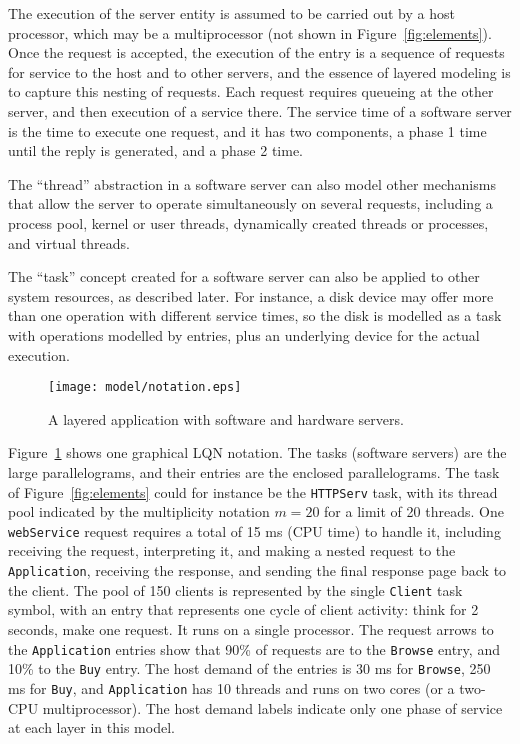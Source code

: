 \documentclass[11pt]{article}
\begin{document}
The execution of the server entity is assumed to be carried out by a host processor, which may
be a multiprocessor (not shown in Figure~\ref{fig:elements}). Once the request is accepted, the
execution of the entry is a sequence of requests for service to the host and to other servers, and the essence of layered modeling is to capture this 
nesting of requests. Each request requires queueing at the other server, and then execution of a 
service there. The service time of a software server is the time to execute one request, and it has two 
components, a phase 1 time until the reply is generated, and a phase 2 time.

The ``thread'' abstraction in a software server can also model other mechanisms that allow the
server to operate simultaneously on several requests, including a process pool, kernel or user
threads, dynamically created threads or processes, and virtual threads.

The ``task'' concept created for a software server can also be applied to other system resources,
as described later. For instance, a disk device may offer more than one operation with different
service times, so the disk is modelled as a task with operations modelled by entries, plus an
underlying device for the actual execution.

\begin{figure}
  \centering
  \texttt{[image: model/notation.eps]}
  \caption{A layered application with software and hardware servers.}
  \label{fig:notation}
\end{figure}

Figure~\ref{fig:notation} shows one graphical LQN notation. The tasks (software servers) are the
large parallelograms, and their entries are the enclosed parallelograms. The task of Figure~\ref{fig:elements} could for
instance be the \texttt{HTTPServ} task, with its thread pool indicated by the multiplicity notation $m=20$
for a limit of 20 threads. One \texttt{webService} request requires a total of 15 ms (CPU time) to
handle it, including receiving the request, interpreting it, and making a nested request to the
\texttt{Application}, receiving the response, and sending the final response page back to the
client. The pool of 150 clients is represented by the single \texttt{Client} task symbol, with an entry
that represents one cycle of client activity: think for 2 seconds, make one request. It runs on
a single processor. The request arrows to the \texttt{Application} entries show that 90\% of requests
are to the \texttt{Browse} entry, and 10\% to the \texttt{Buy} entry. The host demand of the entries is 30 ms for
\texttt{Browse}, 250 ms for \texttt{Buy}, and \texttt{Application} has 10 threads and runs on two cores (or a two-CPU
multiprocessor). The host demand labels indicate only one phase of service at each layer in
this model.
\end{document}
